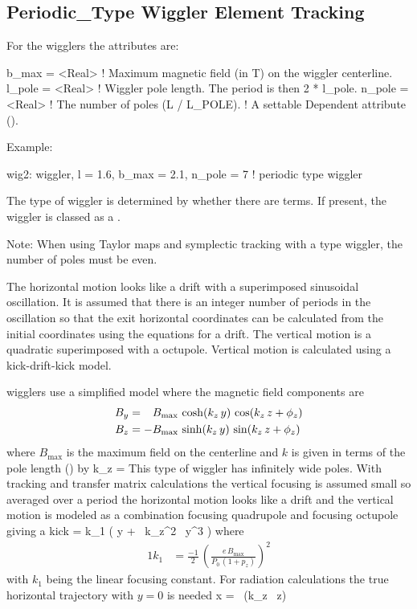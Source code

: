 {%
\subsection{Periodic\_Type Wiggler Element Tracking}
\label{s:wiggler.periodic}

For the  wigglers the attributes are: 
\begin{example}  
  b_max    = <Real>  ! Maximum magnetic field (in T) on the wiggler centerline. 
  l_pole   = <Real>  ! Wiggler pole length. The period is then 2 * l_pole.
  n_pole   = <Real>  ! The number of poles (L / L_POLE). 
                     !   A settable Dependent attribute ().
\end{example}

Example:
\begin{example}
  wig2: wiggler, l = 1.6, b_max = 2.1, n_pole = 7  ! periodic type wiggler
\end{example}

The type of wiggler is determined by whether there are 
terms. If present, the wiggler is classed as a .

Note: When using Taylor maps and symplectic tracking with a
 type wiggler, the number of poles must be even.

The horizontal motion looks like a drift with a superimposed
sinusoidal oscillation. It is assumed that there is an integer number
of periods in the oscillation so that the exit horizontal coordinates
can be calculated from the initial coordinates using the equations for
a drift. The vertical motion is a quadratic superimposed with a
octupole. Vertical motion is calculated using a kick-drift-kick model.

 wigglers use a simplified model where the magnetic
field components are
\begin{alignat}{1}
  B_y &= \hphantom{-} B_{\max} \, \cosh(k_z \, y) \, \cos(k_z \, z + \phi_z) \nonumber \\
  B_z &= -B_{\max} \, \sinh(k_z \, y) \, \sin(k_z \, z + \phi_z) 
  \label{bbkykz}
\end{alignat}
where $B_{\max}$ is the maximum field on the centerline and $k$ is
given in terms of the pole length () by
\Begineq
  k_z = 
\Endeq
This type of wiggler has infinitely wide poles. With
 tracking and transfer matrix calculations the
vertical focusing is assumed small so averaged over a period the
horizontal motion looks like a drift and the vertical motion is
modeled as a combination focusing quadrupole and focusing octupole
giving a kick\cite{b:corbett}
\Begineq
   = k_1 \left( y +  \, k_z^2 \, y^3 \right)
\Endeq
where
\begin{alignat}{1}
  k_1 &= \frac{-1}{2} \, \left( \frac{e \, B_{\max}}{P_0 \, (1 + p_z)} \right)^2 
\end{alignat}
with $k_1$ being the linear focusing constant. For radiation
calculations the true horizontal trajectory with $y = 0$ is needed
\Begineq
  x =  \, \cos (k_z \, z)
\Endeq

}
